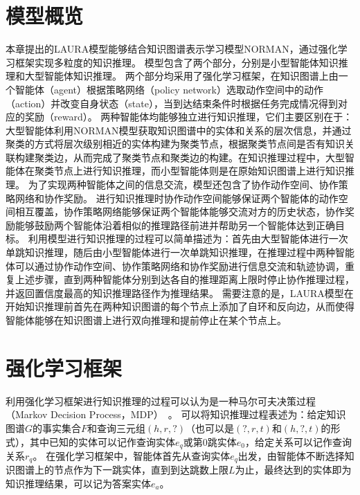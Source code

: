 \documentclass[algorithmlist, AutoFakeBold, AutoFakeSlant, figurelist, tablelist, nomlist, engineering]{seuthesix}
\begin{document}
\section{模型概览}
本章提出的LAURA模型能够结合知识图谱表示学习模型NORMAN，通过强化学习框架实现多粒度的知识推理。
模型包含了两个部分，分别是小型智能体知识推理和大型智能体知识推理。
两个部分均采用了强化学习框架，在知识图谱上由一个智能体（agent）根据策略网络（policy network）选取动作空间中的动作（action）并改变自身状态（state），当到达结束条件时根据任务完成情况得到对应的奖励（reward）。
两种智能体均能够独立进行知识推理，它们主要区别在于：大型智能体利用NORMAN模型获取知识图谱中的实体和关系的层次信息，并通过聚类的方式将层次级别相近的实体构建为聚类节点，根据聚类节点间是否有知识关联构建聚类边，从而完成了聚类节点和聚类边的构建。在知识推理过程中，大型智能体在聚类节点上进行知识推理，而小型智能体则是在原始知识图谱上进行知识推理。
为了实现两种智能体之间的信息交流，模型还包含了协作动作空间、协作策略网络和协作奖励。
进行知识推理时协作动作空间能够保证两个智能体的动作空间相互覆盖，协作策略网络能够保证两个智能体能够交流对方的历史状态，协作奖励能够鼓励两个智能体沿着相似的推理路径前进并帮助另一个智能体达到正确目标。
利用模型进行知识推理的过程可以简单描述为：首先由大型智能体进行一次单跳知识推理，随后由小型智能体进行一次单跳知识推理，在推理过程中两种智能体可以通过协作动作空间、协作策略网络和协作奖励进行信息交流和轨迹协调，重复上述步骤，直到两种智能体分别到达各自的推理距离上限时停止协作推理过程，并返回置信度最高的知识推理路径作为推理结果。
需要注意的是，LAURA模型在开始知识推理前首先在两种知识图谱的每个节点上添加了自环和反向边，从而使得智能体能够在知识图谱上进行双向推理和提前停止在某个节点上。



\section{强化学习框架}
利用强化学习框架进行知识推理的过程可以认为是一种马尔可夫决策过程（Markov Decision Process，MDP）~\cite{gronauer2022multi}。
可以将知识推理过程表述为：给定知识图谱$G$的事实集合$F$和查询三元组$(h, r, ?)$（也可以是$(?, r, t)$和$(h, ?, t)$的形式），其中已知的实体可以记作查询实体$e_q$或第0跳实体$e_0$，给定关系可以记作查询关系$r_q$。
在强化学习框架中，智能体首先从查询实体$e_q$出发，由智能体不断选择知识图谱上的节点作为下一跳实体，直到到达跳数上限$L$为止，最终达到的实体即为知识推理结果，可以记为答案实体$e_a$。
\end{document}
